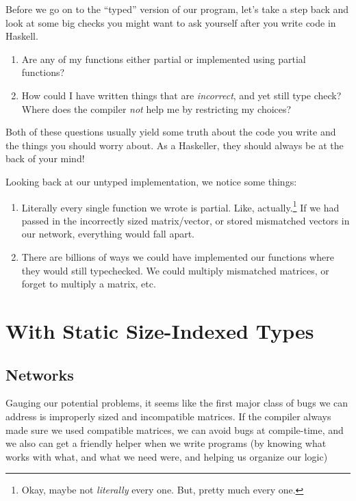 \documentclass[]{article}
\begin{document}
Before we go on to the ``typed'' version of our program, let's take a step back
and look at some big checks you might want to ask yourself after you write code
in Haskell.

\begin{enumerate}
\def\labelenumi{\arabic{enumi}.}
\tightlist
\item
  Are any of my functions either partial or implemented using partial functions?
\item
  How could I have written things that are \emph{incorrect}, and yet still type
  check? Where does the compiler \emph{not} help me by restricting my choices?
\end{enumerate}

Both of these questions usually yield some truth about the code you write and
the things you should worry about. As a Haskeller, they should always be at the
back of your mind!

Looking back at our untyped implementation, we notice some things:

\begin{enumerate}
\def\labelenumi{\arabic{enumi}.}
\tightlist
\item
  Literally every single function we wrote is partial. Like, actually.\footnote{Okay,
    maybe not \emph{literally} every one. But, pretty much every one.} If we had
  passed in the incorrectly sized matrix/vector, or stored mismatched vectors in
  our network, everything would fall apart.
\item
  There are billions of ways we could have implemented our functions where they
  would still typechecked. We could multiply mismatched matrices, or forget to
  multiply a matrix, etc.
\end{enumerate}

\hypertarget{with-static-size-indexed-types}{%
\section{With Static Size-Indexed Types}\label{with-static-size-indexed-types}}

\hypertarget{networks}{%
\subsection{Networks}\label{networks}}

Gauging our potential problems, it seems like the first major class of bugs we
can address is improperly sized and incompatible matrices. If the compiler
always made sure we used compatible matrices, we can avoid bugs at compile-time,
and we also can get a friendly helper when we write programs (by knowing what
works with what, and what we need were, and helping us organize our logic)
\end{document}

